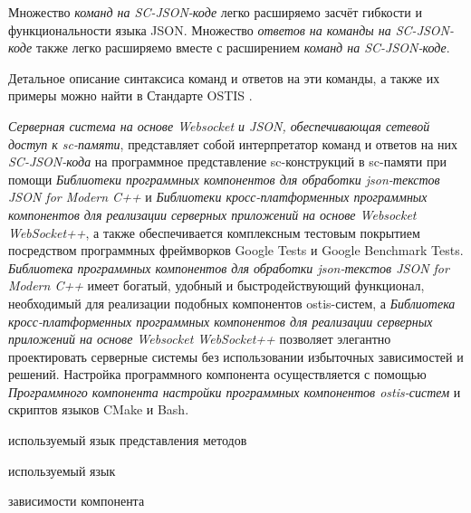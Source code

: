 Множество \textit{команд на SC-JSON-коде} легко расширяемо засчёт гибкости и функциональности языка JSON. Множество \textit{ответов на команды на SC-JSON-коде} также легко расширяемо вместе с расширением \textit{команд на SC-JSON-коде}.

Детальное описание синтаксиса команд и ответов на эти команды, а также их примеры можно найти в Стандарте OSTIS \cite{Standard2021}.

\textit{Серверная система на основе Websocket и JSON, обеспечивающая сетевой доступ к sc-памяти}, представляет собой интерпретатор команд и ответов на них \textit{SC-JSON-кода} на программное представление sc-конструкций в sc-памяти при помощи \textit{Библиотеки программных компонентов для обработки json-текстов JSON for Modern C++} и \textit{Библиотеки кросс-платформенных программных компонентов для реализации серверных приложений на основе Websocket WebSocket++}, а также обеспечивается комплексным тестовым покрытием посредством программных фреймворков Google Tests и Google Benchmark Tests. \textit{Библиотека программных компонентов для обработки json-текстов JSON for Modern C++} имеет богатый, удобный и быстродействующий функционал, необходимый для реализации подобных компонентов ostis-систем, а \textit{Библиотека кросс-платформенных программных компонентов для реализации серверных приложений на основе Websocket WebSocket++} позволяет элегантно проектировать серверные системы без использовании избыточных зависимостей и решений. Настройка программного компонента осуществляется с помощью \textit{Программного компонента настройки программных компонентов ostis-систем} и скриптов языков CMake и Bash.

\begin{SCn}
\begin{scnrelfromlist}{используемый язык представления методов}
\end{scnrelfromlist}
\begin{scnrelfromlist}{используемый язык}
\end{scnrelfromlist}
\begin{scnrelfromset}{зависимости компонента}
\end{scnrelfromset}
\end{SCn}

